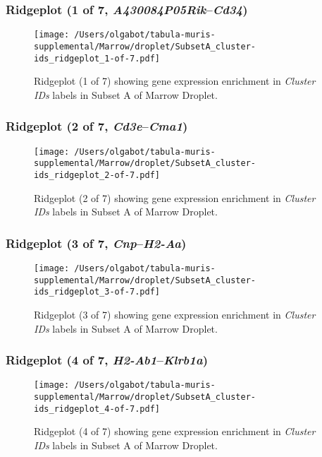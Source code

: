 \clearpage

\subsubsection{Ridgeplot (1 of 7, \emph{A430084P05Rik}--\emph{Cd34})}
\begin{figure}[h]
\centering
\texttt{[image: /Users/olgabot/tabula-muris-supplemental/Marrow/droplet/SubsetA\_cluster-ids\_ridgeplot\_1-of-7.pdf]}

\caption{ Ridgeplot (1 of 7)  showing gene expression enrichment in \emph{Cluster IDs} labels in Subset A of Marrow Droplet. }
\end{figure}


\clearpage

\subsubsection{Ridgeplot (2 of 7, \emph{Cd3e}--\emph{Cma1})}
\begin{figure}[h]
\centering
\texttt{[image: /Users/olgabot/tabula-muris-supplemental/Marrow/droplet/SubsetA\_cluster-ids\_ridgeplot\_2-of-7.pdf]}

\caption{ Ridgeplot (2 of 7)  showing gene expression enrichment in \emph{Cluster IDs} labels in Subset A of Marrow Droplet. }
\end{figure}


\clearpage

\subsubsection{Ridgeplot (3 of 7, \emph{Cnp}--\emph{H2-Aa})}
\begin{figure}[h]
\centering
\texttt{[image: /Users/olgabot/tabula-muris-supplemental/Marrow/droplet/SubsetA\_cluster-ids\_ridgeplot\_3-of-7.pdf]}

\caption{ Ridgeplot (3 of 7)  showing gene expression enrichment in \emph{Cluster IDs} labels in Subset A of Marrow Droplet. }
\end{figure}


\clearpage

\subsubsection{Ridgeplot (4 of 7, \emph{H2-Ab1}--\emph{Klrb1a})}
\begin{figure}[h]
\centering
\texttt{[image: /Users/olgabot/tabula-muris-supplemental/Marrow/droplet/SubsetA\_cluster-ids\_ridgeplot\_4-of-7.pdf]}

\caption{ Ridgeplot (4 of 7)  showing gene expression enrichment in \emph{Cluster IDs} labels in Subset A of Marrow Droplet. }
\end{figure}



